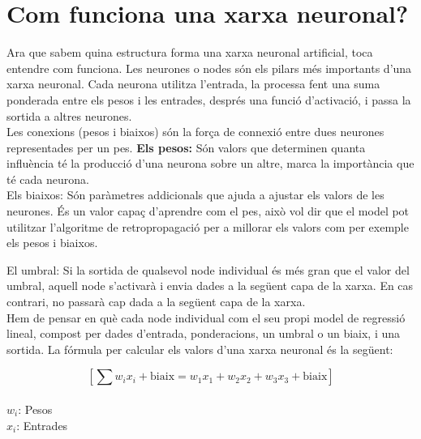 \section{Com funciona una xarxa neuronal?}\label{sec:3.8}
Ara que sabem quina estructura forma una xarxa neuronal artificial, toca entendre com funciona. Les neurones o nodes són els pilars més importants d'una xarxa neuronal. Cada neurona utilitza l'entrada, la processa fent una suma ponderada entre els pesos i les entrades, després una funció d'activació, i passa la sortida a altres neurones.\\

Les conexions (pesos i biaixos) són la força de connexió entre dues neurones representades per un pes.
\textbf{Els pesos:} Són valors que determinen quanta influència té la producció d'una neurona sobre un altre, marca la importància que té cada neurona.\\

Els biaixos: Són paràmetres addicionals que ajuda a ajustar els valors de les neurones. És un valor capaç d'aprendre com el pes, això vol dir que el model pot utilitzar l'algoritme de retropropagació per a millorar els valors com per exemple els pesos i biaixos.

El umbral: Si la sortida de qualsevol node individual és més gran que el valor del umbral, aquell node s'activarà i envia dades a la següent capa de la xarxa. En cas contrari, no passarà cap dada a la següent capa de la xarxa.\\

Hem de pensar en què cada node individual com el seu propi model de regressió lineal, compost per dades d'entrada, ponderacions, un umbral o un biaix, i una sortida. La fórmula per calcular els valors d'una xarxa neuronal és la següent:

$$[
\sum w_i x_i + \text{biaix} = w_1 x_1 + w_2 x_2 + w_3 x_3 + \text{biaix}
]$$ \\

$w_i$: Pesos\\
$x_i$: Entrades\\

